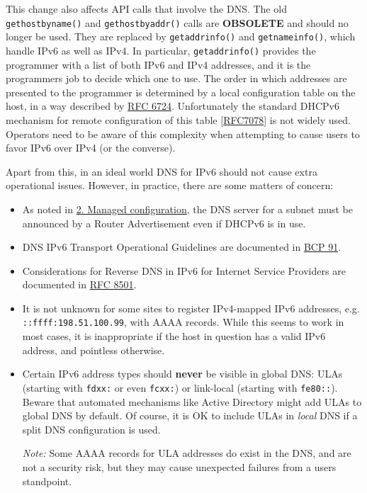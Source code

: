 \documentclass[
]{article}
\begin{document}
This change also affects API calls that involve the DNS. The old
\texttt{gethostbyname()} and \texttt{gethostbyaddr()} calls are
\textbf{OBSOLETE} and should no longer be used. They are replaced by
\texttt{getaddrinfo()} and \texttt{getnameinfo()}, which handle IPv6 as
well as IPv4. In particular, \texttt{getaddrinfo()} provides the
programmer with a list of both IPv6 and IPv4 addresses, and it is the
programmer\textquotesingle s job to decide which one to use. The order
in which addresses are presented to the programmer is determined by a
local configuration table on the host, in a way described by
\href{https://www.rfc-editor.org/info/rfc6724}{RFC 6724}. Unfortunately
the standard DHCPv6 mechanism for remote configuration of this table
{[}\href{https://www.rfc-editor.org/info/rfc7078}{RFC7078}{]} is not
widely used. Operators need to be aware of this complexity when
attempting to cause users to favor IPv6 over IPv4 (or the converse).

Apart from this, in an ideal world DNS for IPv6 should not cause extra
operational issues. However, in practice, there are some matters of
concern:

\begin{itemize}
\item
  As noted in \hyperref[managed-configuration]{2. Managed
  configuration}, the DNS server for a subnet must be announced by a
  Router Advertisement even if DHCPv6 is in use.
\item
  DNS IPv6 Transport Operational Guidelines are documented in
  \href{https://www.rfc-editor.org/info/bcp91}{BCP 91}.
\item
  Considerations for Reverse DNS in IPv6 for Internet Service Providers
  are documented in \href{https://www.rfc-editor.org/info/rfc8501}{RFC
  8501}.
\item
  It is not unknown for some sites to register IPv4-mapped IPv6
  addresses, e.g. \texttt{::ffff:198.51.100.99}, with AAAA records.
  While this seems to work in most cases, it is inappropriate if the
  host in question has a valid IPv6 address, and pointless otherwise.
\item
  Certain IPv6 address types should \textbf{never} be visible in global
  DNS: ULAs (starting with \texttt{fdxx:} or even \texttt{fcxx:}) or
  link-local (starting with \texttt{fe80::}). Beware that automated
  mechanisms like Active Directory might add ULAs to global DNS by
  default. Of course, it is OK to include ULAs in \emph{local} DNS if a
  split DNS configuration is used.

  \emph{Note:} Some AAAA records for ULA addresses do exist in the DNS,
  and are not a security risk, but they may cause unexpected failures
  from a user\textquotesingle s standpoint.
\end{itemize}
\end{document}
